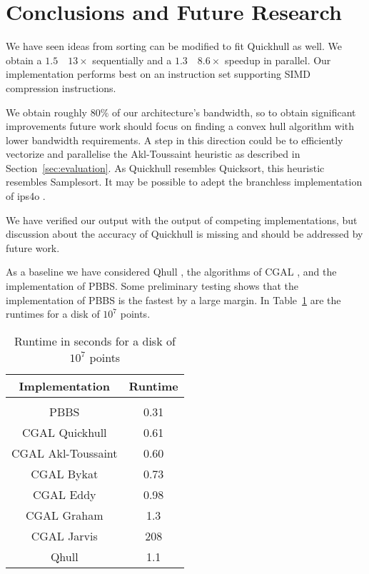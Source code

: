 \section{Conclusions and Future Research}

We have seen ideas from sorting can be modified to fit Quickhull as well.
We obtain a $1.5$~\textendash~$13\times$ sequentially and a 
$1.3$~\textendash~$8.6\times$ speedup in parallel. Our implementation performs
best on an instruction set supporting SIMD compression instructions.

We obtain roughly $80\%$ of our architecture's bandwidth, so to obtain 
significant improvements future work should focus on finding a convex hull
algorithm with lower bandwidth requirements. A step in this direction could
be to efficiently vectorize and parallelise the Akl-Toussaint heuristic as
described in Section~\ref{sec:evaluation}.
As Quickhull resembles Quicksort, this heuristic resembles Samplesort.
It may be possible to adept the branchless implementation of ips4o \cite{ips4o}.

We have verified our output with the output of competing implementations, but
discussion about the accuracy of Quickhull is missing and should be addressed
by future work.

As a baseline we have considered Qhull \cite{}, the algorithms of CGAL \cite{},
and the implementation of PBBS. Some preliminary testing shows that the
implementation of PBBS is the fastest by a large margin. In
Table~\ref{table:reference} are the runtimes for a disk of $10^7$ points.

\begin{table}[ht]
    \caption{Runtime in seconds for a disk of $10^7$ points}
    \label{table:reference}
    \begin{tabular}{c | c }
     Implementation & Runtime \\ 
     \hline \\
     PBBS & 0.31 \\  
     CGAL Quickhull & 0.61 \\
     CGAL Akl-Toussaint & 0.60 \\
     CGAL Bykat & 0.73 \\
     CGAL Eddy & 0.98 \\
     CGAL Graham & 1.3 \\
     CGAL Jarvis & 208 \\
     Qhull & 1.1 \\
    \end{tabular}
\end{table}


